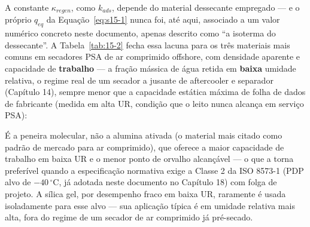 \documentclass[12pt,a4paper]{article}
\numberwithin{equation}{section}
\numberwithin{table}{section}
\numberwithin{figure}{section}
\begin{document}
		A constante $\kappa_{regen}$, como $k_{ads}$, depende do material dessecante empregado — e o próprio $q_{eq}$ da Equação~\eqref{eq:s15-1} nunca foi, até aqui, associado a um valor numérico concreto neste documento, apenas descrito como ``a isoterma do dessecante''. A Tabela~\ref{tab:15-2} fecha essa lacuna para os três materiais mais comuns em secadores PSA de ar comprimido offshore, com densidade aparente e capacidade de \textbf{trabalho} — a fração mássica de água retida em \textbf{baixa} umidade relativa, o regime real de um secador a jusante de aftercooler e separador (Capítulo 14), sempre menor que a capacidade estática máxima de folha de dados de fabricante (medida em alta UR, condição que o leito nunca alcança em serviço PSA):

		\begin{table}[h!tbp]
			\centering
			\caption[Propriedades de referência dos materiais dessecantes]{Propriedades de referência dos materiais dessecantes mais comuns em secadores PSA de ar comprimido — densidade aparente e capacidade de trabalho em baixa UR (ASSUMIDO, faixas típicas de literatura/fabricante), constante de taxa de adsorção e tempos de regeneração/resfriamento de referência.}
			\label{tab:15-2}
		\end{table}

		É a peneira molecular, não a alumina ativada (o material mais citado como padrão de mercado para ar comprimido), que oferece a maior capacidade de trabalho em baixa UR e o menor ponto de orvalho alcançável — o que a torna preferível quando a especificação normativa exige a Classe 2 da ISO 8573-1 (PDP alvo de $-40\,^{\circ}\text{C}$, já adotada neste documento no Capítulo 18) com folga de projeto. A sílica gel, por desempenho fraco em baixa UR, raramente é usada isoladamente para esse alvo — sua aplicação típica é em umidade relativa mais alta, fora do regime de um secador de ar comprimido já pré-secado.
\end{document}
